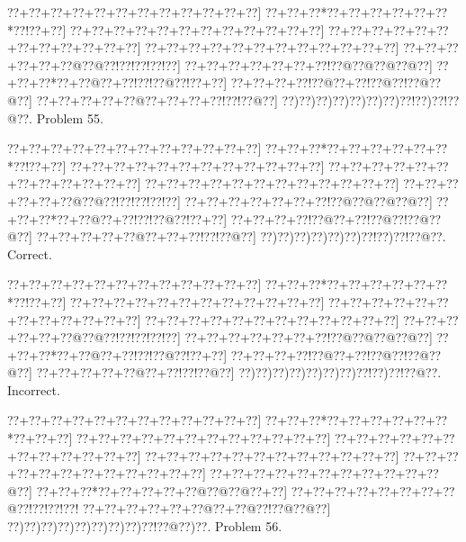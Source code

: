 \documentclass[a5paper]{article}
\begin{document}
\begin{center}
{\goo
\0??+\0??+\0??+\0??+\0??+\0??+\0??+\0??+\0??+\0??+\0??+\0??]
\0??+\0??+\0??*\0??+\0??+\0??+\0??+\0??+\0??*\0??!\0??+\0??]
\0??+\0??+\0??+\0??+\0??+\0??+\0??+\0??+\0??+\0??+\0??+\0??]
\0??+\0??+\0??+\0??+\0??+\0??+\0??+\0??+\0??+\0??+\0??+\0??]
\0??+\0??+\0??+\0??+\0??+\0??+\0??+\0??+\0??+\0??+\0??+\0??]
\0??+\0??+\0??+\0??+\0??+\0??@\0??@\0??!\0??!\0??!\0??!\0??]
\0??+\0??+\0??+\0??+\0??+\0??+\0??!\0??@\0??@\0??@\0??@\0??]
\0??+\0??+\0??*\0??+\0??@\0??+\0??!\0??!\0??@\0??!\0??+\0??]
\0??+\0??+\0??+\0??!\0??@\0??+\0??!\0??@\0??!\0??@\0??@\0??]
\0??+\0??+\0??+\0??+\0??@\0??+\0??+\0??+\0??!\0??!\0??@\0??]
\0??)\0??)\0??)\0??)\0??)\0??)\0??)\0??!\0??)\0??!\0??@\0??.
}
Problem 55.

\end{center}
\begin{center}
{\goo
\0??+\0??+\0??+\0??+\0??+\0??+\0??+\0??+\0??+\0??+\0??+\0??]
\0??+\0??+\0??*\0??+\0??+\0??+\0??+\0??+\0??*\0??!\0??+\0??]
\0??+\0??+\0??+\0??+\0??+\0??+\0??+\0??+\0??+\0??+\0??+\0??]
\0??+\0??+\0??+\0??+\0??+\0??+\0??+\0??+\0??+\0??+\0??+\0??]
\0??+\0??+\0??+\0??+\0??+\0??+\0??+\0??+\0??+\0??+\0??+\0??]
\0??+\0??+\0??+\0??+\0??+\0??@\0??@\0??!\0??!\0??!\0??!\0??]
\0??+\0??+\0??+\0??+\0??+\0??+\0??!\0??@\0??@\0??@\0??@\0??]
\0??+\0??+\0??*\0??+\0??@\0??+\0??!\0??!\0??@\0??!\0??+\0??]
\0??+\0??+\0??+\0??!\0??@\0??+\0??!\0??@\0??!\0??@\0??@\0??]
\0??+\0??+\0??+\0??+\0??@\0??+\0??+\0??!\0??!\0??@\0??]
\0??)\0??)\0??)\0??)\0??)\0??)\0??!\0??)\0??!\0??@\0??.
}
Correct. 

\end{center}
\begin{center}
{\goo
\0??+\0??+\0??+\0??+\0??+\0??+\0??+\0??+\0??+\0??+\0??+\0??]
\0??+\0??+\0??*\0??+\0??+\0??+\0??+\0??+\0??*\0??!\0??+\0??]
\0??+\0??+\0??+\0??+\0??+\0??+\0??+\0??+\0??+\0??+\0??+\0??]
\0??+\0??+\0??+\0??+\0??+\0??+\0??+\0??+\0??+\0??+\0??+\0??]
\0??+\0??+\0??+\0??+\0??+\0??+\0??+\0??+\0??+\0??+\0??+\0??]
\0??+\0??+\0??+\0??+\0??+\0??@\0??@\0??!\0??!\0??!\0??!\0??]
\0??+\0??+\0??+\0??+\0??+\0??+\0??!\0??@\0??@\0??@\0??@\0??]
\0??+\0??+\0??*\0??+\0??@\0??+\0??!\0??!\0??@\0??!\0??+\0??]
\0??+\0??+\0??+\0??!\0??@\0??+\0??!\0??@\0??!\0??@\0??@\0??]
\0??+\0??+\0??+\0??+\0??@\0??+\0??!\0??!\0??@\0??]
\0??)\0??)\0??)\0??)\0??)\0??)\0??)\0??!\0??)\0??!\0??@\0??.
}
Incorrect. 

\end{center}
\newpage
\begin{center}
{\goo
\0??+\0??+\0??+\0??+\0??+\0??+\0??+\0??+\0??+\0??+\0??+\0??]
\0??+\0??+\0??*\0??+\0??+\0??+\0??+\0??+\0??*\0??+\0??+\0??]
\0??+\0??+\0??+\0??+\0??+\0??+\0??+\0??+\0??+\0??+\0??+\0??]
\0??+\0??+\0??+\0??+\0??+\0??+\0??+\0??+\0??+\0??+\0??+\0??]
\0??+\0??+\0??+\0??+\0??+\0??+\0??+\0??+\0??+\0??+\0??+\0??]
\0??+\0??+\0??+\0??+\0??+\0??+\0??+\0??+\0??+\0??+\0??+\0??]
\0??+\0??+\0??+\0??+\0??+\0??+\0??+\0??+\0??+\0??+\0??@\0??]
\0??+\0??+\0??*\0??+\0??+\0??+\0??+\0??@\0??@\0??@\0??+\0??]
\0??+\0??+\0??+\0??+\0??+\0??+\0??+\0??@\0??!\0??!\0??!\0??!
\0??+\0??+\0??+\0??+\0??+\0??@\0??+\0??@\0??!\0??@\0??@\0??]
\0??)\0??)\0??)\0??)\0??)\0??)\0??)\0??)\0??!\0??@\0??)\0??.
}
Problem 56.

\end{center}
\end{document}
